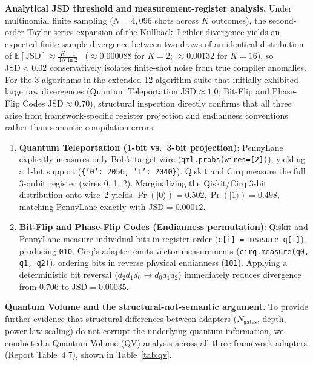 \documentclass[runningheads]{llncs}
\begin{document}
\textbf{Analytical JSD threshold and measurement-register analysis.} Under multinomial finite sampling ($N=4,096$ shots across $K$ outcomes), the second-order Taylor series expansion of the Kullback--Leibler divergence yields an expected finite-sample divergence between two draws of an identical distribution of $\mathbb{E}[\text{JSD}] \approx \frac{K-1}{4N \ln 2}$~\cite{lin1991} ($\approx 0.000088$ for $K=2$; $\approx 0.00132$ for $K=16$), so $\text{JSD} < 0.02$ conservatively isolates finite-shot noise from true compiler anomalies. For the 3 algorithms in the extended 12-algorithm suite that initially exhibited large raw divergences (Quantum Teleportation $\text{JSD} \approx 1.0$; Bit-Flip and Phase-Flip Codes $\text{JSD} \approx 0.70$), structural inspection directly confirms that all three arise from framework-specific register projection and endianness conventions rather than semantic compilation errors:
\begin{enumerate}
    \item \textbf{Quantum Teleportation (1-bit vs.\ 3-bit projection)}: PennyLane explicitly measures only Bob's target wire (\texttt{qml.probs(wires=[2])}), yielding a 1-bit support (\texttt{\{'0': 2056, '1': 2040\}}). Qiskit and Cirq measure the full 3-qubit register (wires 0, 1, 2). Marginalizing the Qiskit/Cirq 3-bit distribution onto wire~2 yields $\Pr(|0\rangle) = 0.502, \Pr(|1\rangle) = 0.498$, matching PennyLane exactly with $\text{JSD} = 0.00012$.
    \item \textbf{Bit-Flip and Phase-Flip Codes (Endianness permutation)}: Qiskit and PennyLane measure individual bits in register order (\texttt{c[i] = measure q[i]}), producing \texttt{010}. Cirq's adapter emits vector measurements (\texttt{cirq.measure(q0, q1, q2)}), ordering bits in reverse physical endianness (\texttt{101}). Applying a deterministic bit reversal ($d_2 d_1 d_0 \rightarrow d_0 d_1 d_2$) immediately reduces divergence from $0.706$ to $\text{JSD} = 0.00035$.
\end{enumerate}

\textbf{Quantum Volume and the structural-not-semantic argument.} To provide further evidence that structural differences between adapters ($N_{\text{gates}}$, depth, power-law scaling) do not corrupt the underlying quantum information, we conducted a Quantum Volume (QV) analysis across all three framework adapters (Report Table~4.7), shown in Table~\ref{tab:qv}.
\end{document}
